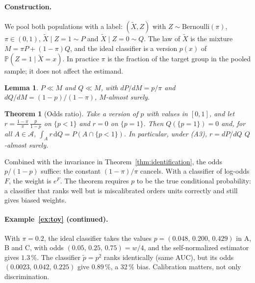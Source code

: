 \documentclass[twoside,11pt]{article}
\newcommand{\PP}{\mathbb{P}}
\newcommand{\A}{\mathcal{A}}
\newcommand{\dd}{\,\mathrm{d}}
\theoremstyle{plain}
\newtheorem{theorem}{Theorem}
\newtheorem{lemma}{Lemma}
\theoremstyle{definition}
\begin{document}
\paragraph{Construction.} We pool both populations with a label: $(\tilde X,Z)$ with $Z\sim\mathrm{Bernoulli}(\pi)$, $\pi\in(0,1)$, $\tilde X\mid Z=1\sim P$ and $\tilde X\mid Z=0\sim Q$. The law of $\tilde X$ is the mixture $M=\pi P+(1-\pi)Q$, and the ideal classifier is a version $p(x)$ of $\PP(Z=1\mid\tilde X=x)$. In practice $\pi$ is the fraction of the target group in the pooled sample; it does not affect the estimand.

\begin{lemma}\label{lem:mixture}
$P\ll M$ and $Q\ll M$, with $dP/dM=p/\pi$ and $dQ/dM=(1-p)/(1-\pi)$, $M$-almost surely.
\end{lemma}

\begin{theorem}[Odds ratio]\label{thm:odds}
Take a version of $p$ with values in $[0,1]$, and let $r=\frac{1-\pi}{\pi}\,\frac{p}{1-p}$ on $\{p<1\}$ and $r=0$ on $\{p=1\}$. Then $Q(\{p=1\})=0$ and, for all $A\in\A$, $\int_A r\dd Q=P(A\cap\{p<1\})$. In particular, under (A3), $r=dP/dQ$ $Q$-almost surely.
\end{theorem}

Combined with the invariance in Theorem~\ref{thm:identification}, the odds $p/(1-p)$ suffice: the constant $(1-\pi)/\pi$ cancels. With a classifier of log-odds $F$, the weight is $e^{F}$. The theorem requires $p$ to be the true conditional probability: a classifier that ranks well but is miscalibrated orders units correctly and still gives biased weights.

\paragraph{Example~\ref{ex:toy} (continued).}
With $\pi=0.2$, the ideal classifier takes the values $p=(0.048,\,0.200,\,0.429)$ in A, B and C, with odds $(0.05,\,0.25,\,0.75)=w/4$, and the self-normalized estimator gives $1.3\,\%$. The classifier $\tilde p=p^2$ ranks identically (same AUC), but its odds $(0.0023,\,0.042,\,0.225)$ give $0.89\,\%$, a 32\,\% bias. Calibration matters, not only discrimination.
\end{document}
